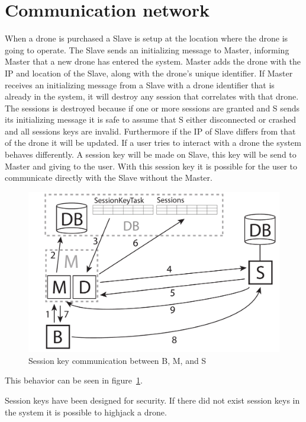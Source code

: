 \section{Communication network}

When a drone is purchased a Slave is setup at the location where the drone is going to operate.
The Slave sends an initializing message to Master, informing Master that a new drone has entered the system.
Master adds the drone with the IP and location of the Slave, along with the drone's unique identifier.
If Master receives an initializing message from a Slave with a drone identifier that is already in the system, it will destroy any session that correlates with that drone. The sessions is destroyed because if one or more sessions are granted and S sends its initializing message it is safe to assume that S either disconnected or crashed and all sessions keys are invalid.
Furthermore if the IP of Slave differs from that of the drone it will be updated.
If a user tries to interact with a drone the system behaves differently. A session key will be made on Slave, this key will be send to Master and giving to the user. With this session key it is possible for the user to communicate directly with the Slave without the Master.

\begin{figure}[!ht]
    \centering 
    \includegraphics[width=\textwidth]{gfx/sessionkey_communication.pdf}
    \caption{Session key communication between B, M, and S}
    \label{fig:sessionkey_communication}
\end{figure}

This behavior can be seen in figure~\ref{fig:sessionkey_communication}. 


Session keys have been designed for security. If there did not exist session keys in the system it is possible to highjack a drone.

